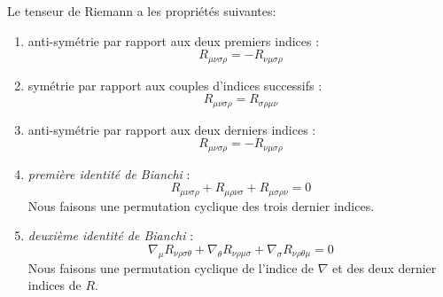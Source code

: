 \documentclass[a4paper,11pt]{report}
\begin{document}
                \begin{prop}\begin{leftbar}
                    Le tenseur de Riemann a les propriétés suivantes:
                    \begin{enumerate}[label = \textit{\roman*)}]
                        \item anti-symétrie par rapport aux deux premiers indices :
                        \begin{equation}
                            R_{\mu\nu\sigma\rho} = -R_{\nu\mu\sigma\rho}
                        \end{equation}
                        \item symétrie par rapport aux couples d'indices successifs :
                        \begin{equation}
                            R_{\mu\nu\sigma\rho} = R_{\sigma\rho\mu\nu}
                        \end{equation}
                        \item anti-symétrie par rapport aux deux derniers indices :
                        \begin{equation}
                            R_{\mu\nu\sigma\rho} = -R_{\nu\mu\sigma\rho}
                        \end{equation}
                        \item \textit{première identité de Bianchi} :
                        \begin{equation}
                        R_{\mu\nu\sigma\rho}+R_{\mu\rho\nu\sigma}+R_{\mu\sigma\rho\nu} = 0
                        \end{equation}
                        Nous faisons une permutation cyclique des trois dernier indices.
                        \item \textit{deuxième identité de Bianchi} :
                        \begin{equation}
                            \nabla_\mu R_{\nu\rho\sigma\theta} + \nabla_\theta R_{\nu\rho\mu\sigma}+\nabla_\sigma R_{\nu\rho\theta\mu} = 0
                        \end{equation}
                        Nous faisons une permutation cyclique de l'indice de $\nabla$ et des deux dernier indices de $R$.
                    \end{enumerate}
                \end{leftbar}\end{prop}
                
\end{document}
